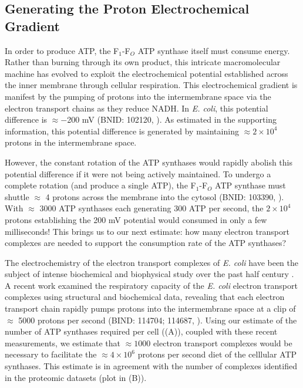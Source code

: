\subsection{Generating the Proton Electrochemical Gradient}
In order to produce ATP, the F$_1$-F$_O$ ATP synthase itself must consume
energy. Rather than burning through its own product, this intricate
macromolecular machine has evolved to exploit the electrochemical potential
established across the inner membrane through cellular respiration. This
electrochemical gradient is manifest  by the pumping of protons into the
intermembrane space via the electron transport chains as they reduce NADH. In
\textit{E. coli}, this potential difference is $\approx -$200 mV (BNID: 102120,
\cite{milo2010}). As estimated in the supporting information, this potential
difference is generated by maintaining $\approx 2\times 10^4$ protons in the
intermembrane space.

However, the constant rotation of the ATP synthases would rapidly abolish
this potential difference if it were not being actively maintained. To
undergo a complete rotation (and produce a single ATP), the F$_1$-F$_O$ ATP
synthase must shuttle $\approx$ 4 protons across the membrane into the
cytosol (BNID: 103390, \cite{milo2010}). With $\approx$ 3000 ATP synthases each
generating 300 ATP per second, the $2 \times 10^4$ protons establishing the 200
mV potential would consumed in only a few milliseconds! This brings us
to our next estimate: how many electron transport complexes are needed to
support the consumption rate of the ATP synthases?

The electrochemistry of the electron transport complexes of \textit{E. coli}
have been the subject of intense biochemical and biophysical study over the past
half century \citep{ingledew1984, khademian2017,cox1970,henkel2014}. A recent
work \citep{szenk2017} examined the respiratory capacity of the \textit{E. coli}
electron transport complexes using structural and biochemical data, revealing
that each electron transport chain rapidly pumps protons into the intermembrane
space at a clip of $\approx$ 5000 protons per second (BIND: 114704; 114687,
\cite{milo2010}). Using our estimate of the number of ATP synthases required per
cell ((A)), coupled with these recent measurements, we
estimate that $\approx 1000$ electron transport complexes would be necessary to
facilitate the $\approx 4\times 10^6$ protons per second diet of the celllular
ATP synthases. This estimate is in agreement with the number of complexes
identified in the proteomic datasets (plot in (B)).

